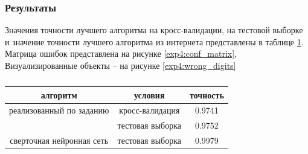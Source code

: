 \documentclass[a4paper, 11pt]{article}
\begin{document}
    \subsubsection{Результаты}
    Значения точности лучшего алгоритма на кросс-валидации, на тестовой выборке и значение точности лучшего алгоритма из интернета представлены в таблице \ref{exp4:table}. Матрица ошибок представлена на рисунке \ref{exp4:conf_matrix}, Визуализированные объекты -- на рисунке \ref{exp4:wrong_digits}\
    \begin{table}[h]
        \begin{center} 
            \caption{} \label{exp4:table}
            \begin{tabular}{|c|c|c|}
                \hline 
                алгоритм & условия & точность \\ 
                \hline 
                реализованный по заданию & кросс-валидация & 0.9741 \\ 
                \cline{2-3}
                & тестовая выборка & 0.9752 \\ 
                \hline
                сверточная нейронная сеть & тестовая выборка & 0.9979 \\ 
                \hline 
            \end{tabular} 
        \end{center}
    \end{table}
\end{document}
